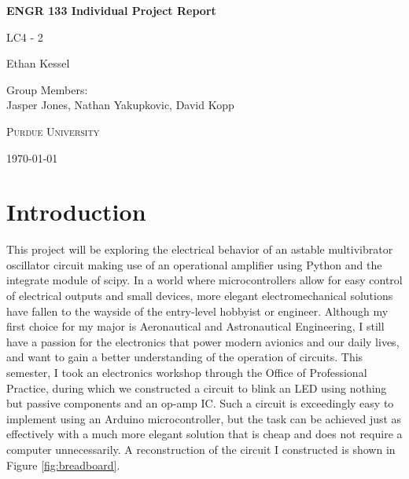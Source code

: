 \documentclass[12pt]{article}
\def\myname{Ethan Kessel}
\def\mytitle{ENGR 133 Individual Project Report}
\def\mysubtitle{LC4 - 2}
\begin{document}
\begin{titlepage}
\vspace*{1in}
\centering

{\bfseries\LARGE \mytitle \par}
\vspace{0.5in}
{\large \mysubtitle \par}
\vfill
{\Large \myname \par}
\vspace{0.5in}
Group Members:\\
Jasper Jones, Nathan Yakupkovic, David Kopp\par
\vfill
{\scshape\Large Purdue University\par}
\vspace{0.5in}
{\large \today\par}

\vspace*{1.5in}
\thispagestyle{empty}
\end{titlepage}

\tableofcontents
\listoffigures
\listoftables
\thispagestyle{empty}
\clearpage

\setcounter{page}{1}

\section{Introduction}
This project will be exploring the electrical behavior of an astable multivibrator oscillator circuit making use of an operational amplifier using Python and the integrate module of scipy. In a world where microcontrollers allow for easy control of electrical outputs and small devices, more elegant electromechanical solutions have fallen to the wayside of the entry-level hobbyist or engineer. Although my first choice for my major is Aeronautical and Astronautical Engineering, I still have a passion for the electronics that power modern avionics and our daily lives, and want to gain a better understanding of the operation of circuits. This semester, I took an electronics workshop through the Office of Professional Practice, during which we constructed a circuit to blink an LED using nothing but passive components and an op-amp IC.  Such a circuit is exceedingly easy to implement using an Arduino microcontroller, but the task can be achieved just as effectively with a much more elegant solution that is cheap and does not require a computer unnecessarily. A reconstruction of the circuit I constructed is shown in Figure \ref{fig:breadboard}.
\end{document}
